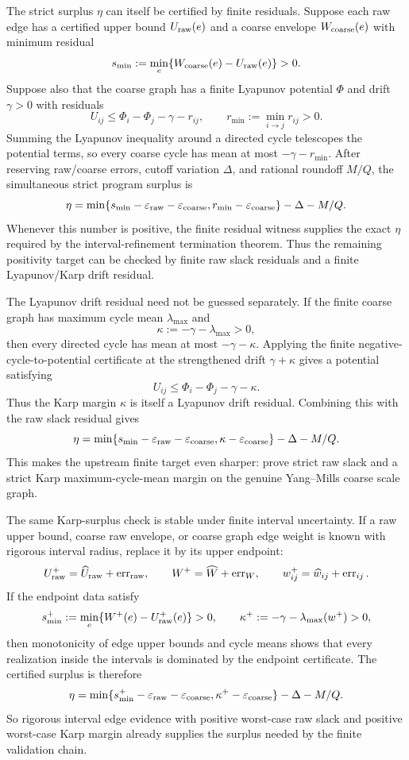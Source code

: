 The strict surplus $\eta$ can itself be certified by finite residuals. Suppose
each raw edge has a certified upper bound $U_{\rm raw}(e)$ and a coarse
envelope $W_{\rm coarse}(e)$ with minimum residual
\[
  s_{\min}:=\min_e\{W_{\rm coarse}(e)-U_{\rm raw}(e)\}>0.
\]
Suppose also that the coarse graph has a finite Lyapunov potential $\Phi$ and
drift $\gamma>0$ with residuals
\[
  U_{ij}\leq \Phi_i-\Phi_j-\gamma-r_{ij},
  \qquad r_{\min}:=\min_{i\to j}r_{ij}>0 .
\]
Summing the Lyapunov inequality around a directed cycle telescopes the
potential terms, so every coarse cycle has mean at most
$-\gamma-r_{\min}$. After reserving raw/coarse errors, cutoff variation
$\Delta$, and rational roundoff $M/Q$, the simultaneous strict program surplus
is
\[
  \eta=
  \min\{s_{\min}-\varepsilon_{\rm raw}-\varepsilon_{\rm coarse},
          r_{\min}-\varepsilon_{\rm coarse}\}
  -\Delta-M/Q .
\]
Whenever this number is positive, the finite residual witness supplies the
exact $\eta$ required by the interval-refinement termination theorem. Thus the
remaining positivity target can be checked by finite raw slack residuals and a
finite Lyapunov/Karp drift residual.

The Lyapunov drift residual need not be guessed separately. If the finite
coarse graph has maximum cycle mean $\lambda_{\max}$ and
\[
  \kappa:=-\gamma-\lambda_{\max}>0,
\]
then every directed cycle has mean at most $-\gamma-\kappa$. Applying the
finite negative-cycle-to-potential certificate at the strengthened drift
$\gamma+\kappa$ gives a potential satisfying
\[
  U_{ij}\leq \Phi_i-\Phi_j-\gamma-\kappa .
\]
Thus the Karp margin $\kappa$ is itself a Lyapunov drift residual. Combining
this with the raw slack residual gives
\[
  \eta=
  \min\{s_{\min}-\varepsilon_{\rm raw}-\varepsilon_{\rm coarse},
          \kappa-\varepsilon_{\rm coarse}\}
  -\Delta-M/Q .
\]
This makes the upstream finite target even sharper: prove strict raw slack and
a strict Karp maximum-cycle-mean margin on the genuine Yang--Mills coarse
scale graph.

The same Karp-surplus check is stable under finite interval uncertainty. If a
raw upper bound, coarse raw envelope, or coarse graph edge weight is known with
rigorous interval radius, replace it by its upper endpoint:
\[
  U_{\rm raw}^+=\widehat U_{\rm raw}+\operatorname{err}_{\rm raw},\qquad
  W^+=\widehat W+\operatorname{err}_W,\qquad
  w_{ij}^+=\widehat w_{ij}+\operatorname{err}_{ij}.
\]
If the endpoint data satisfy
\[
  s_{\min}^+:=\min_e\{W^+(e)-U_{\rm raw}^+(e)\}>0,
  \qquad
  \kappa^+:=-\gamma-\lambda_{\max}(w^+)>0,
\]
then monotonicity of edge upper bounds and cycle means shows that every
realization inside the intervals is dominated by the endpoint certificate.
The certified surplus is therefore
\[
  \eta=
  \min\{s_{\min}^+-\varepsilon_{\rm raw}-\varepsilon_{\rm coarse},
          \kappa^+-\varepsilon_{\rm coarse}\}
  -\Delta-M/Q .
\]
So rigorous interval edge evidence with positive worst-case raw slack and
positive worst-case Karp margin already supplies the surplus needed by the
finite validation chain.

